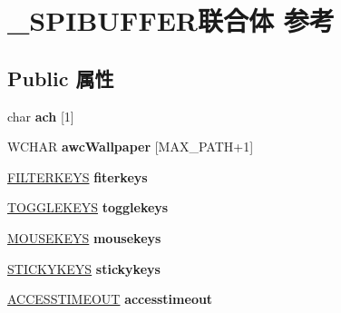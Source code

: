 \hypertarget{union___s_p_i_b_u_f_f_e_r}{}\section{\+\_\+\+S\+P\+I\+B\+U\+F\+F\+E\+R联合体 参考}
\label{union___s_p_i_b_u_f_f_e_r}
\subsection*{Public 属性}
\begin{DoxyCompactItemize}
\item 
\mbox{\label{union___s_p_i_b_u_f_f_e_r_a5d80658e243de36d6f1a9fe5df8ac6da}} 
char {\bfseries ach} \mbox{[}1\mbox{]}
\item 
\mbox{\label{union___s_p_i_b_u_f_f_e_r_a30560107fb71c3a45a1ac7a15d27ef84}} 
W\+C\+H\+AR {\bfseries awc\+Wallpaper} \mbox{[}M\+A\+X\+\_\+\+P\+A\+TH+1\mbox{]}
\item 
\mbox{\label{union___s_p_i_b_u_f_f_e_r_a7218ed121d1978eb0c016386377b6e75}} 
\hyperlink{structtag_f_i_l_t_e_r_k_e_y_s}{F\+I\+L\+T\+E\+R\+K\+E\+YS} {\bfseries fiterkeys}
\item 
\mbox{\label{union___s_p_i_b_u_f_f_e_r_aa1fbbe52fc364db9ad5f8e9860df9040}} 
\hyperlink{structtag_t_o_g_g_l_e_k_e_y_s}{T\+O\+G\+G\+L\+E\+K\+E\+YS} {\bfseries togglekeys}
\item 
\mbox{\label{union___s_p_i_b_u_f_f_e_r_a4bdd4ba9f3565b9b1d2a9fd0fc771677}} 
\hyperlink{structtag_m_o_u_s_e_k_e_y_s}{M\+O\+U\+S\+E\+K\+E\+YS} {\bfseries mousekeys}
\item 
\mbox{\label{union___s_p_i_b_u_f_f_e_r_a99d67a353698c028d1c12a0f6819b1ce}} 
\hyperlink{structtag_s_t_i_c_k_y_k_e_y_s}{S\+T\+I\+C\+K\+Y\+K\+E\+YS} {\bfseries stickykeys}
\item 
\mbox{\label{union___s_p_i_b_u_f_f_e_r_a65bb35884e580aac23026b8a7f0a0b33}} 
\hyperlink{structtag_a_c_c_e_s_s_t_i_m_e_o_u_t}{A\+C\+C\+E\+S\+S\+T\+I\+M\+E\+O\+UT} {\bfseries accesstimeout}
\item 

\end{DoxyCompactItemize}
